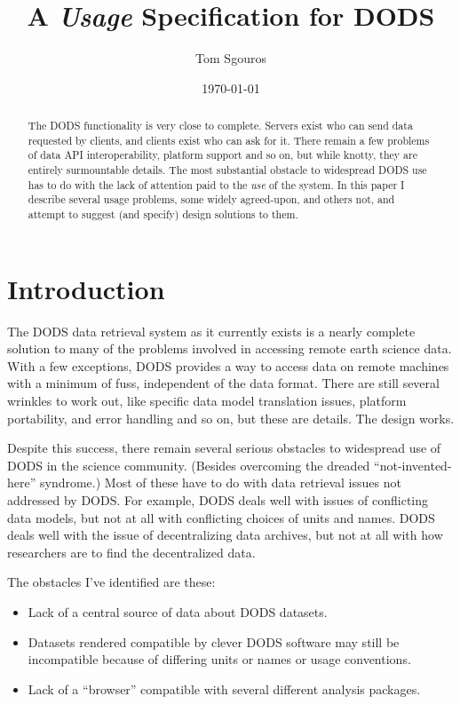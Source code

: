 \documentclass[10pt]{report}
\begin{document}
\title{A \emph{Usage} Specification for DODS}
\author{Tom Sgouros}
\date{\today}

\maketitle

\begin{abstract} 
  The DODS functionality is very close to complete.  Servers exist who
  can send data requested by clients, and clients exist who can ask
  for it.  There remain a few problems of data API interoperability,
  platform support and so on, but while knotty, they are entirely
  surmountable details.  The most substantial obstacle to widespread
  DODS use has to do with the lack of attention paid to the \emph{use}
  of the system.  In this paper I describe several usage problems,
  some widely agreed-upon, and others not, and attempt to suggest (and
  specify) design solutions to them.
\end{abstract}



\tableofcontents

\chapter{Introduction}
\label{sec:intro}

The DODS data retrieval system as it currently exists is a nearly
complete solution to many of the problems involved in accessing
remote earth science data.  With a few exceptions, DODS provides a way
to access data on remote machines with a minimum of fuss, independent
of the data format.  There are still several wrinkles to work out,
like specific data model translation issues, platform portability, and
error handling and so on, but these are details.  The design works.

Despite this success, there remain several serious obstacles to
widespread use of DODS in the science community.  (Besides overcoming
the dreaded ``not-invented-here'' syndrome.)  Most of these have to do
with data retrieval issues not addressed by DODS.  For example, DODS
deals well with issues of conflicting data models, but not at all with
conflicting choices of units and names.  DODS deals well with the
issue of decentralizing data archives, but not at all with how
researchers are to find the decentralized data.

The obstacles I've identified are these:

\begin{itemize}

\item Lack of a central source of data about DODS datasets.

\item Datasets rendered compatible by clever DODS software may still
  be incompatible because of differing units or names or usage
  conventions. 

\item Lack of a ``browser'' compatible with several different analysis
  packages.

\end{itemize}
\end{document}
